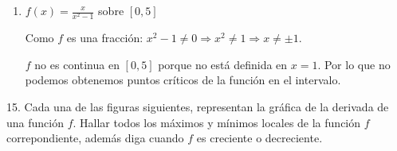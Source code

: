 \documentclass[12pt]{article}
\begin{document}
\begin{enumerate}[\hspace{9px} a)]
        Como $f$ es un polinomio, es continua y diferenciable en todos los $\mathbbm{R}$.\medskip

        Obtenemos $f'(x)$:

        \[\displaystyle\frac{d}{dx}\big(x^3+x+1\big) = \frac{d}{dx}x^3 + \frac{d}{dx}x + \frac{d}{dx}1 = 3x^2+1\]\medskip

        Ahora buscamos los puntos cr\'iticos:

        \[3x^2+1=0 \Rightarrow 3x^2=-1 \Rightarrow x^2=-\displaystyle\frac{1}{3} \Rightarrow x=\sqrt{-\frac{1}{3}}\]\medskip

        Como no existe ninguna $x$ tal que $x=\sqrt{-\displaystyle\frac{1}{3}}$ podemos concluir que la funci\'on no tiene puntos cr\'iticos.\medskip

        Entonces solo queda comparar los valores extremos del intervalo:

        \(f(-1) = (-1)^3+(-1)+1 = -1-1+1 = -1\)

        \(f(1) = (1)^3+(1)+1 = 1+1+1 = 3\)\medskip

        As\'i tenemos que:
        \begin{itemize}
            \item $f(-1)<f(1)$
            \item No hay puntos cr\'iticos en $[-1,1]$
        \end{itemize}

        Entonces: 
        \begin{center}
            \textbf{M\'aximo: } $(1,3)$ \hspace{4em} \textbf{M\'inimo: } $(-1,-1)$
        \end{center}\medskip

    \item \(f(x)=\displaystyle\frac{x}{x^2-1}\) sobre $[0,5]$\medskip
    
        Como $f$ es una fracci\'on: \quad \(x^2-1 \neq 0 \Rightarrow x^2\neq1 \Rightarrow x\neq\pm1\).\bigskip

        $f$ no es continua en $[0,5]$ porque no est\'a definida en $x=1$. Por lo que no podemos obtenemos puntos cr\'iticos de la funci\'on en el intervalo.

\end{enumerate}

15. Cada una de las figuras siguientes, representan la gr\'afica de la derivada de una funci\'on $f$. Hallar todos los m\'aximos y m\'inimos locales de la funci\'on $f$ correpondiente, adem\'as diga cuando $f$ es creciente o decreciente.
\end{document}
